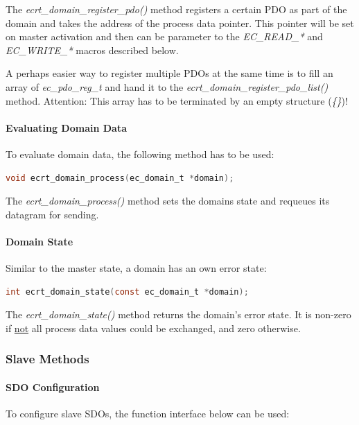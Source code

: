 \documentclass[a4paper,12pt,BCOR6mm,bibtotoc,idxtotoc]{scrbook}
\begin{document}
The \textit{ecrt\_domain\_register\_pdo()} method registers a certain
PDO as part of the domain and takes the address of the process data
pointer. This pointer will be set on master activation and then can be
parameter to the \textit{EC\_READ\_*} and \textit{EC\_WRITE\_*} macros
described below.

A perhaps easier way to register multiple PDOs at the same time is to
fill an array of \textit{ec\_pdo\_reg\_t} and hand it to the
\textit{ecrt\_domain\_register\_pdo\_list()} method. Attention: This
array has to be terminated by an empty structure (\textit{\{\}})!

\paragraph{Evaluating Domain Data}

To evaluate domain data, the following method has to be used:

\begin{lstlisting}[language=C]
  void ecrt_domain_process(ec_domain_t *domain);
\end{lstlisting}

The \textit{ecrt\_domain\_process()} method sets the domains state and
requeues its datagram for sending.

\paragraph{Domain State}

Similar to the master state, a domain has an own error state:

\begin{lstlisting}[language=C]
  int ecrt_domain_state(const ec_domain_t *domain);
\end{lstlisting}

The \textit{ecrt\_domain\_state()} method returns the domain's error
state. It is non-zero if \underline{not} all process data values could
be exchanged, and zero otherwise.

\subsubsection{Slave Methods}
\label{sec:ecrt-slave}

\paragraph{SDO Configuration}

To configure slave SDOs, the function interface below can be used:
\end{document}
